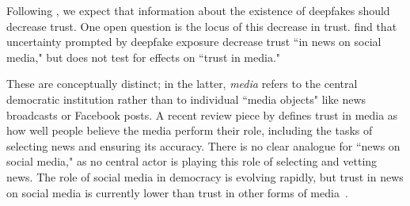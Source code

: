 \documentclass[12pt,letterpaper]{article}
\begin{document}
Following \cite{vaccari2020deepfakes}, we expect that information about the existence of deepfakes should decrease trust. One open question is the locus of this decrease in trust. \cite{vaccari2020deepfakes} find that uncertainty prompted by deepfake exposure decrease trust ``in news on social media," but does not test for effects on ``trust in media." 


These are conceptually distinct;  in the latter,  \textit{media} refers to the central democratic institution rather than to individual ``media objects" like news broadcasts or Facebook posts. A recent review piece by \cite{schiffrin2019credibility} defines trust in media as how well people believe the media perform their role, including the tasks of selecting news and ensuring its accuracy. There is no clear analogue for ``news on social media," as no central actor is playing this role of selecting and vetting news.  
The role of social media in democracy is evolving rapidly, but trust in news on social media is currently lower than trust in other forms of media~\citep{newman2019reuters}.%

\end{document}
